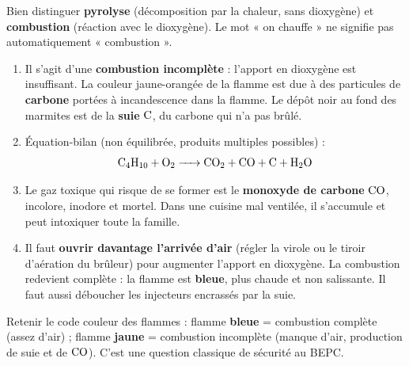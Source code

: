 \documentclass[11pt]{article}
\begin{document}
\begin{attention}
Bien distinguer \textbf{pyrolyse} (décomposition par la chaleur, sans dioxygène) et \textbf{combustion} (réaction avec le dioxygène). Le mot « on chauffe » ne signifie pas automatiquement « combustion ».
\end{attention}

\begin{corrige}
\begin{enumerate}
    \item Il s'agit d'une \textbf{combustion incomplète} : l'apport en dioxygène est insuffisant. La couleur jaune-orangée de la flamme est due à des particules de \textbf{carbone} portées à incandescence dans la flamme. Le dépôt noir au fond des marmites est de la \textbf{suie} $\ce{C}$, du carbone qui n'a pas brûlé.
    \item Équation-bilan (non équilibrée, produits multiples possibles) :
    \[ \ce{C4H10 + O2 -> CO2 + CO + C + H2O} \]
    \item Le gaz toxique qui risque de se former est le \textbf{monoxyde de carbone} $\ce{CO}$, incolore, inodore et mortel. Dans une cuisine mal ventilée, il s'accumule et peut intoxiquer toute la famille.
    \item Il faut \textbf{ouvrir davantage l'arrivée d'air} (régler la virole ou le tiroir d'aération du brûleur) pour augmenter l'apport en dioxygène. La combustion redevient complète : la flamme est \textbf{bleue}, plus chaude et non salissante. Il faut aussi déboucher les injecteurs encrassés par la suie.
\end{enumerate}
\end{corrige}

\begin{attention}
Retenir le code couleur des flammes : flamme \textbf{bleue} = combustion complète (assez d'air) ; flamme \textbf{jaune} = combustion incomplète (manque d'air, production de suie et de $\ce{CO}$). C'est une question classique de sécurité au BEPC.
\end{attention}
\end{document}
